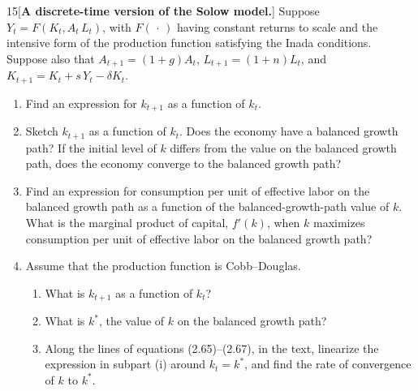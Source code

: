 \begin{problem}{15}[\textbf{A discrete-time version of the Solow model.}]
Suppose \(Y_t=F\left(K_t,A_t\,L_t\right)\), with \(F\left(\,\cdot\,\right)\) having constant returns to scale and the intensive form of the production function satisfying the Inada conditions. Suppose also that \(A_{t+1}=\left(1+g\right)A_t\), \(L_{t+1}=\left(1+n\right)L_t\), and \(K_{t+1}=K_t+s\,Y_t-\delta K_t\).
\begin{enumerate}[label=(\alph*)]
    \item Find an expression for \(k_{t+1}\) as a function of \(k_t\).
    \item Sketch \(k_{t+1}\) as a function of \(k_t\). Does the economy have a balanced growth path? If the initial level of \(k\) differs from the value on the balanced growth path, does the economy converge to the balanced growth path?
    \item Find an expression for consumption per unit of effective labor on the balanced growth path as a function of the balanced-growth-path value of \(k\). What is the marginal product of capital, \(f'\left(k\right)\), when \(k\) maximizes consumption per unit of effective labor on the balanced growth path?
    \item Assume that the production function is Cobb--Douglas.
    \begin{enumerate}[label=(\roman*)]
        \item What is \(k_{t+1}\) as a function of \(k_t\)?
        \item What is \(k^*\), the value of \(k\) on the balanced growth path?
        \item Along the lines of equations (2.65)--(2.67), in the text, linearize the expression in subpart (i) around \(k_t=k^*\), and find the rate of convergence of \(k\) to \(k^*\).
    \end{enumerate}
\end{enumerate}
\end{problem}


